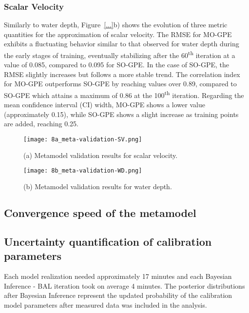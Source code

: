 \documentclass[draft,linenumbers,onecolumn]{agujournal2019} %
\begin{document}
\subsubsection{Scalar Velocity}
Similarly to water depth, Figure~\ref{...}b) shows the evolution of three metric quantities for the approximation of scalar velocity. The RMSE for MO-GPE exhibits a fluctuating behavior similar to that observed for water depth during the early stages of training, eventually stabilizing after the 60\textsuperscript{th} iteration at a value of 0.085, compared to 0.095 for SO-GPE. In the case of SO-GPE, the RMSE slightly increases but follows a more stable trend. The correlation index for MO-GPE outperforms SO-GPE by reaching values over 0.89, compared to SO-GPE which attains a maximum of 0.86 at the 100\textsuperscript{th} iteration. Regarding the mean confidence interval (CI) width, MO-GPE shows a lower value (approximately 0.15), while SO-GPE shows a slight increase as training points are added, reaching 0.25.

\begin{figure}[!htbp]
	\centering
	\begin{minipage}[b]{0.49\textwidth}
		\centering
		\texttt{[image: 8a\_meta-validation-SV.png]}
		\caption{(a) Metamodel validation results for scalar velocity.}
		\label{fig:meta_validation_sv}
	\end{minipage}
	\hfill
	\begin{minipage}[b]{0.49\textwidth}
		\centering
		\texttt{[image: 8b\_meta-validation-WD.png]}
		\caption{(b) Metamodel validation results for water depth.}
		\label{fig:meta_validation_wd}
	\end{minipage}
\end{figure}

\subsection{Convergence speed of the metamodel}


\subsection{Uncertainty quantification of calibration parameters}

Each model realization needed approximately 17 minutes and each Bayesian Inference - BAL iteration took on average 4 minutes. The posterior distributions after Bayesian Inference represent the updated probability of the calibration model parameters after measured data was included in the analysis.
\end{document}
